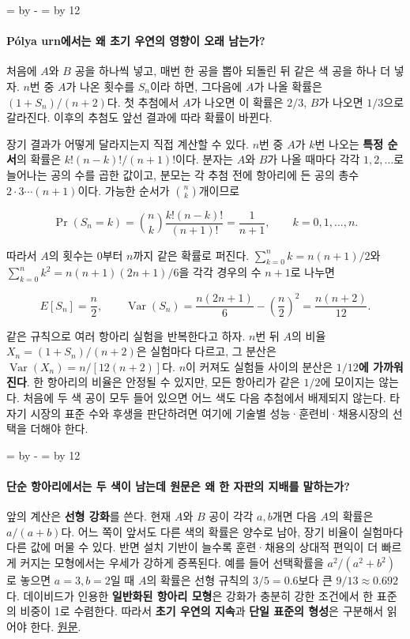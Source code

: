 \documentclass[10pt,a4paper]{article}
\newcommand{\ReserveQuestionSpace}{%
  \par\begingroup
  \dimen0=\pagegoal \advance\dimen0 by -\pagetotal
  \dimen2=\baselineskip \multiply\dimen2 by 12
  \ifdim\dimen0<\dimen2 \newpage\fi
  \endgroup}
\begin{document}
\ReserveQuestionSpace
\paragraph{Pólya urn에서는 왜 초기 우연의 영향이 오래 남는가?}
처음에 $A$와 $B$ 공을 하나씩 넣고, 매번 한 공을 뽑아 되돌린 뒤 같은 색 공을 하나 더 넣자. $n$번 중 $A$가 나온 횟수를 $S_n$이라 하면, 그다음에 $A$가 나올 확률은 $(1+S_n)/(n+2)$다. 첫 추첨에서 $A$가 나오면 이 확률은 $2/3$, $B$가 나오면 $1/3$으로 갈라진다. 이후의 추첨도 앞선 결과에 따라 확률이 바뀐다.\par

장기 결과가 어떻게 달라지는지 직접 계산할 수 있다. $n$번 중 $A$가 $k$번 나오는 \textbf{특정 순서}의 확률은 $k!(n-k)!/(n+1)!$이다. 분자는 $A$와 $B$가 나올 때마다 각각 $1,2,\ldots$로 늘어나는 공의 수를 곱한 값이고, 분모는 각 추첨 전에 항아리에 든 공의 총수 $2\cdot3\cdots(n+1)$이다. 가능한 순서가 $\binom{n}{k}$개이므로\par

\[
\Pr(S_n=k)=\binom{n}{k}\frac{k!(n-k)!}{(n+1)!}=\frac{1}{n+1},\qquad k=0,1,\ldots,n.
\]

따라서 $A$의 횟수는 $0$부터 $n$까지 같은 확률로 퍼진다. $\sum_{k=0}^n k=n(n+1)/2$와 $\sum_{k=0}^n k^2=n(n+1)(2n+1)/6$을 각각 경우의 수 $n+1$로 나누면\par

\[
E[S_n]=\frac n2,\qquad
\operatorname{Var}(S_n)=\frac{n(2n+1)}6-\left(\frac n2\right)^2=\frac{n(n+2)}{12}.
\]

같은 규칙으로 여러 항아리 실험을 반복한다고 하자. $n$번 뒤 $A$의 비율 $X_n=(1+S_n)/(n+2)$은 실험마다 다르고, 그 분산은 $\operatorname{Var}(X_n)=n/[12(n+2)]$다. $n$이 커져도 실험들 사이의 분산은 \textbf{$1/12$에 가까워진다}. 한 항아리의 비율은 안정될 수 있지만, 모든 항아리가 같은 $1/2$에 모이지는 않는다. 처음에 두 색 공이 모두 들어 있으면 어느 색도 다음 추첨에서 배제되지 않는다. 타자기 시장의 표준 수와 후생을 판단하려면 여기에 기술별 성능·훈련비·채용시장의 선택을 더해야 한다.\par

\ReserveQuestionSpace
\paragraph{단순 항아리에서는 두 색이 남는데 원문은 왜 한 자판의 지배를 말하는가?}
앞의 계산은 \textbf{선형 강화}를 쓴다. 현재 $A$와 $B$ 공이 각각 $a,b$개면 다음 $A$의 확률은 $a/(a+b)$다. 어느 쪽이 앞서도 다른 색의 확률은 양수로 남아, 장기 비율이 실험마다 다른 값에 머물 수 있다. 반면 설치 기반이 늘수록 훈련·채용의 상대적 편익이 더 빠르게 커지는 모형에서는 우세가 강하게 증폭된다. 예를 들어 선택확률을 $a^2/(a^2+b^2)$로 놓으면 $a=3,b=2$일 때 $A$의 확률은 선형 규칙의 $3/5=0.6$보다 큰 $9/13\approx0.692$다. 데이비드가 인용한 \textbf{일반화된 항아리 모형}은 강화가 충분히 강한 조건에서 한 표준의 비중이 1로 수렴한다. 따라서 \textbf{초기 우연의 지속}과 \textbf{단일 표준의 형성}은 구분해서 읽어야 한다. \href{https://www.jstor.org/stable/1805621}{원문}.\par
\end{document}

